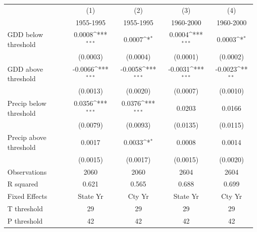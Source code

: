 {
\def\sym#1{\ifmmode^{#1}\else\(^{#1}\)\fi}
\begin{tabular*}{\hsize}{@{\hskip\tabcolsep\extracolsep\fill}l*{4}{c}}
\hline\hline
                &\multicolumn{1}{c}{(1)}&\multicolumn{1}{c}{(2)}&\multicolumn{1}{c}{(3)}&\multicolumn{1}{c}{(4)}\\
                &\multicolumn{1}{c}{1955-1995}&\multicolumn{1}{c}{1955-1995}&\multicolumn{1}{c}{1960-2000}&\multicolumn{1}{c}{1960-2000}\\
\hline
GDD below threshold&   0.0008\sym{***}&   0.0007\sym{*}  &   0.0004\sym{***}&   0.0003\sym{*}  \\
                & (0.0003)         & (0.0004)         & (0.0001)         & (0.0002)         \\
[1em]
GDD above threshold&  -0.0066\sym{***}&  -0.0058\sym{***}&  -0.0031\sym{***}&  -0.0023\sym{**} \\
                & (0.0013)         & (0.0020)         & (0.0007)         & (0.0010)         \\
[1em]
Precip below threshold&   0.0356\sym{***}&   0.0376\sym{***}&   0.0203         &   0.0166         \\
                & (0.0079)         & (0.0093)         & (0.0135)         & (0.0115)         \\
[1em]
Precip above threshold&   0.0017         &   0.0033\sym{*}  &   0.0008         &   0.0014         \\
                & (0.0015)         & (0.0017)         & (0.0015)         & (0.0020)         \\
\hline
Observations    &     2060         &     2060         &     2604         &     2604         \\
R squared       &    0.621         &    0.565         &    0.688         &    0.699         \\
Fixed Effects   & State Yr         &   Cty Yr         & State Yr         &   Cty Yr         \\
T threshold     &       29         &       29         &       29         &       29         \\
P threshold     &       42         &       42         &       42         &       42         \\
\hline\hline
\end{tabular*}
}

